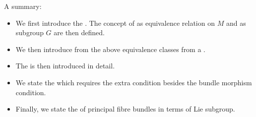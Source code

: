 \documentclass{article}
\begin{document}
A summary:
\begin{itemize}[$\blacktriangleright$]
\item We first introduce the . The concept of  as equivalence relation on $M$ and  as subgroup $G$ are then defined.
\item We then introduce  from the above  equivalence classes from a .
\item The  is then introduced in detail.
\item We state the  which requires the extra  condition besides the bundle morphism condition.
\item Finally, we state the  of principal fibre bundles in terms of Lie subgroup.
\end{itemize}
\end{document}
